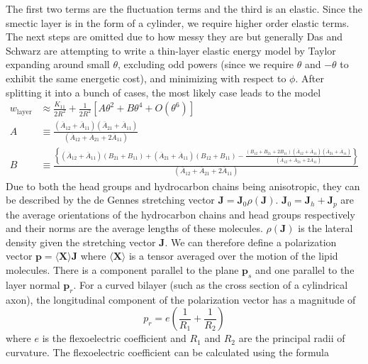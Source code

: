 \documentclass{article}
\newcommand{\vb}[1]{\mathbf{ #1}}
\numberwithin{equation}{section}
\begin{document}
The first two terms are the fluctuation terms and the third is an elastic. Since the smectic layer is in the form of a cylinder, we require higher order elastic terms. The next steps are omitted due to how messy they are but generally Das and Schwarz are attempting to write a thin-layer elastic energy model by Taylor expanding around small $\theta$, excluding odd powers (since we require $\theta$ and $-\theta$ to exhibit the same energetic cost), and minimizing with respect to $\phi$. After splitting it into a bunch of cases, the most likely case leads to the model 
\begin{equation}
\begin{split}
    w_{\text{layer}} &\approx \frac{K_{11}}{2R^2} + \frac{1}{2R^2}[A\theta^2+B\theta^4 + O(\theta^6)] \\
    A &\equiv \frac{(\overline{A}_{12} + \overline{A}_{11})(\overline{A}_{21} + \overline{A}_{11})}{(\overline{A}_{12} + \overline{A}_{21} + 2\overline{A}_{11})} \\
    B &\equiv \frac{\left\{(\overline{A}_{12} + \overline{A}_{11})(B_{21} + B_{11}) + (\overline{A}_{21} + \overline{A}_{11})(B_{12} + B_{11}) - \frac{(B_{12} + B_{21} + 2B_{11})(\overline{A}_{12} + \overline{A}_{11})(\overline{A}_{21} + \overline{A}_{11})}{(\overline{A}_{12} + \overline{A}_{21} + 2\overline{A}_{11})}\right\}}{(\overline{A}_{12} + \overline{A}_{21} + 2\overline{A}_{11})}
\end{split}
\end{equation}
Due to both the head groups and hydrocarbon chains being anisotropic, they can be described by the de Gennes stretching vector $\vb{J} = \vb{J}_0 \rho(\vb{J})$. $\vb{J}_0 = \vb{J}_h + \vb{J}_p$ are the average orientations of the hydrocarbon chains and head groups respectively and their norms are the average lengths of these molecules. $\rho(\vb{J})$ is the lateral density given the stretching vector $\vb{J}$. We can therefore define a polarization vector $\vb{p} = \langle \vb{X}\rangle \vb{J}$ where $\langle \vb{X} \rangle$ is a tensor averaged over the motion of the lipid molecules. There is a component parallel to the plane $\vb{p}_s$ and one parallel to the layer normal $\vb{p}_r$. For a curved bilayer (such as the cross section of a cylindrical axon), the longitudinal component of the polarization vector has a magnitude of 
\begin{equation}
    p_r = e\left( \frac{1}{R_1}+\frac{1}{R_2} \right)
\end{equation}
where $e$ is the flexoelectric coefficient and $R_1$ and $R_2$ are the principal radii of curvature. The flexoelectric coefficient can be calculated using the formula
\end{document}

